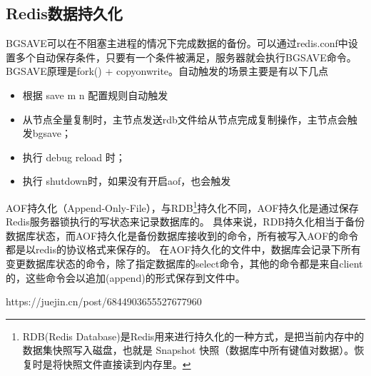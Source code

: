 \documentclass[../../../interview-questions.tex]{subfiles}
\begin{document}
\subsection{Redis数据持久化}

BGSAVE可以在不阻塞主进程的情况下完成数据的备份。可以通过redis.conf中设置多个自动保存条件，只要有一个条件被满足，服务器就会执行BGSAVE命令。BGSAVE原理是fork() + copyonwrite。自动触发的场景主要是有以下几点

\begin{itemize}
    \item {根据 save m n 配置规则自动触发}
    \item {从节点全量复制时，主节点发送rdb文件给从节点完成复制操作，主节点会触发bgsave；}
    \item {执行 debug reload 时；}
    \item {执行 shutdown时，如果没有开启aof，也会触发}
\end{itemize}

AOF持久化（Append-Only-File），与RDB\footnote{RDB(Redis Database)是Redis用来进行持久化的一种方式，是把当前内存中的数据集快照写入磁盘，也就是 Snapshot 快照（数据库中所有键值对数据）。恢复时是将快照文件直接读到内存里。}持久化不同，AOF持久化是通过保存Redis服务器锁执行的写状态来记录数据库的。
具体来说，RDB持久化相当于备份数据库状态，而AOF持久化是备份数据库接收到的命令，所有被写入AOF的命令都是以redis的协议格式来保存的。
在AOF持久化的文件中，数据库会记录下所有变更数据库状态的命令，除了指定数据库的select命令，其他的命令都是来自client的，这些命令会以追加(append)的形式保存到文件中。


https://juejin.cn/post/6844903655527677960
\end{document}
